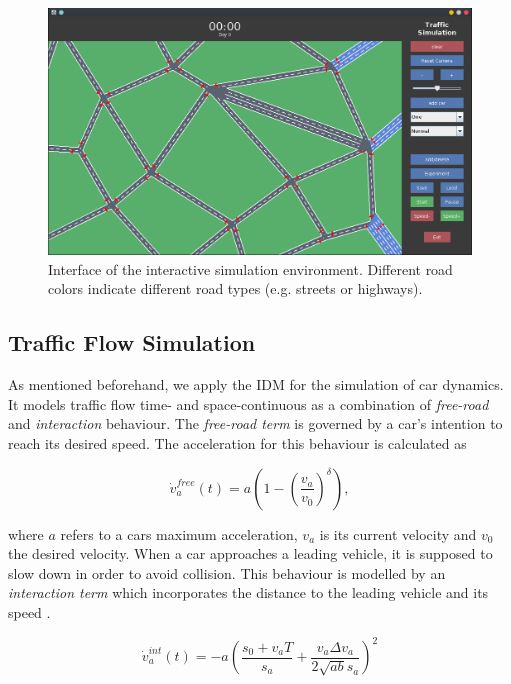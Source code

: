 \documentclass[10pt]{article}
\begin{document}
\begin{figure}
	\includegraphics[width=\linewidth]{img/interface.png}
	\caption{Interface of the interactive simulation environment. Different road colors indicate different road types (e.g. streets or highways). \label{fig:interface}}
\end{figure}
	
\subsection{Traffic Flow Simulation}

As mentioned beforehand, we apply the IDM \citep{treiber2000congested} for the simulation of car dynamics. It models traffic flow time- and space-continuous as a combination of \textit{free-road} and \textit{interaction} behaviour. The \textit{free-road term} is governed by a car's intention to reach its desired speed. The acceleration for this behaviour is calculated \citep{treiber2000congested} as

\begin{equation}
	\label{eq:free-road-term}
	\dot{v}_a^{free}(t) = a ( 1 - ( \frac{v_a}{v_0} )^\delta),
\end{equation}

where $a$ refers to a cars maximum acceleration, $v_a$ is its current velocity and $v_0$ the desired velocity. When a car approaches a leading vehicle, it is supposed to slow down in order to avoid collision. This behaviour is modelled by an \textit{interaction term} which incorporates the distance to the leading vehicle and its speed \citep{treiber2000congested}. 

\begin{equation}
	\label{eq:int-term}
	\dot{v}_a^{int}(t) = - a ( \frac{s_0 + v_a T}{s_a} + \frac{v_a \Delta v_a}{2 \sqrt{ab} s_a} )^2
\end{equation}
\end{document}
